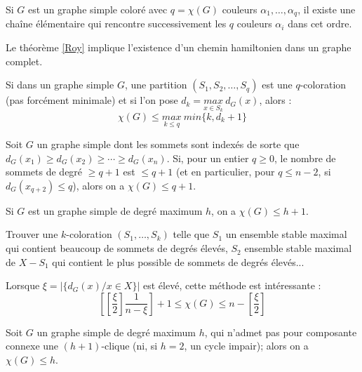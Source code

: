 \begin{corollaire}
Si $G$ est un graphe simple coloré avec $q=\chi(G)$ couleurs $\alpha_1,\dots,\alpha_q$, il
existe une chaîne élémentaire qui rencontre successivement les $q$ couleurs $\alpha_i$
dans cet ordre.
\end{corollaire}
\setcounter{corollaire}{0}

\begin{rmq}
Le théorème \ref{Roy} implique l'existence d'un chemin hamiltonien dans un graphe complet.
\end{rmq}
\setcounter{rmq}{0}

\begin{theorem}
Si dans un graphe simple $G$, une partition $(S_1,S_2,\dots,S_q)$ est une $q$-coloration (pas
forcément minimale) et si l'on pose $d_k=\underset{x\in S_k}{max}\ d_G(x)$, alors :
$$\chi(G) \leq \underset{k \leq q}{max}\ min \{k, d_k+1\}$$ 
\end{theorem}

\begin{corollaire}
Soit $G$ un graphe simple dont les sommets sont indexés de sorte que $d_G(x_1)\geq d_G(x_2)\geq
\cdots\geq d_G(x_n)$.
Si, pour un entier $q \geq 0$, le nombre de sommets de degré $\geq q+1$ est $\leq q+1$ (et
en particulier, pour $q \leq n-2$, si $d_G(x_{q+2})\leq q$), alors on a $\chi(G) \leq q+1$.
\end{corollaire}

\begin{corollaire}
Si $G$ est un graphe simple de degré maximum $h$, on a $\chi(G)\leq h+1$.
\end{corollaire}
\setcounter{corollaire}{0}

\begin{rmq}
Trouver une $k$-coloration $(S_1,\dots,S_k)$ telle que $S_1$ un ensemble stable
maximal qui contient beaucoup de sommets de degrés élevés, $S_2$ ensemble stable maximal
de $X-S_1$ qui contient le plus possible de sommets de degrés élevés...
\end{rmq}

\begin{rmq}
Lorsque $\xi = |\{d_G(x) / x\in X\}|$ est élevé, cette méthode est intéressante :
$$\left [\left [\frac{\xi}{2}\right]\frac{1}{n-\xi} \right ]+1\leq \chi(G)\leq n-\left [\frac{\xi}{2}\right]$$
\end{rmq}
\setcounter{rmq}{0}

\begin{theorem}[brooks, 1941]
Soit $G$ un graphe simple de degré maximum $h$, qui n'admet pas pour composante
connexe une $(h+1)$-clique (ni, si $h=2$, un cycle impair); alors on a $\chi(G)\leq h$.
\end{theorem}

